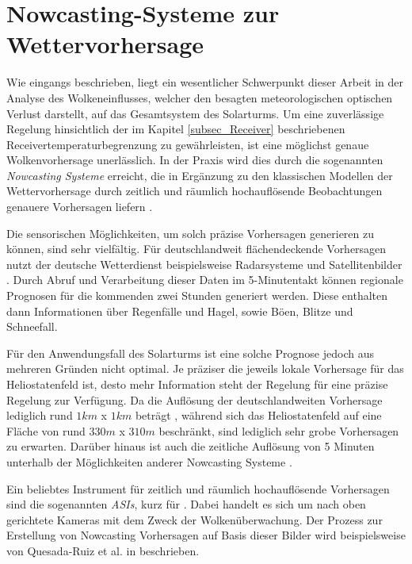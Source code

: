\section{Nowcasting-Systeme zur Wettervorhersage} \label{sec_Nowcasting}
Wie eingangs beschrieben, liegt ein wesentlicher Schwerpunkt dieser Arbeit in der Analyse des Wolkeneinflusses, welcher den besagten meteorologischen optischen Verlust darstellt, auf das Gesamtsystem des Solarturms.
Um eine zuverlässige Regelung hinsichtlich der im Kapitel \ref{subsec_Receiver} beschriebenen Receivertemperaturbegrenzung zu gewährleisten, ist eine möglichst genaue Wolkenvorhersage unerlässlich.
In der Praxis wird dies durch die sogenannten \textit{Nowcasting Systeme} erreicht, die in Ergänzung zu den klassischen Modellen der Wettervorhersage durch zeitlich und räumlich hochauflösende Beobachtungen genauere Vorhersagen liefern \cite{DWD1}.

Die sensorischen Möglichkeiten, um solch präzise Vorhersagen generieren zu können, sind sehr vielfältig.
Für deutschlandweit flächendeckende Vorhersagen nutzt der deutsche Wetterdienst beispielsweise Radarsysteme und Satellitenbilder \cite{DWD1}.
Durch Abruf und Verarbeitung dieser Daten im 5-Minutentakt können regionale Prognosen für die kommenden zwei Stunden generiert werden.
Diese enthalten dann Informationen über Regenfälle und Hagel, sowie Böen, Blitze und Schneefall.

Für den Anwendungsfall des Solarturms ist eine solche Prognose jedoch aus mehreren Gründen nicht optimal.
Je präziser die jeweils lokale Vorhersage für das Heliostatenfeld ist, desto mehr Information steht der Regelung für eine präzise Regelung zur Verfügung.
Da die Auflösung der deutschlandweiten Vorhersage lediglich rund $1km$ x $1km$ beträgt \cite{DWD1}\cite{DWD2}, während sich das Heliostatenfeld auf eine Fläche von rund $330m$ x $310m$ beschränkt, sind lediglich sehr grobe Vorhersagen zu erwarten.
Darüber hinaus ist auch die zeitliche Auflösung von 5 Minuten \cite{DWD2} unterhalb der Möglichkeiten anderer Nowcasting Systeme \cite{DLRNowcasting}\cite[S.272]{QuesadaRuiz}.

Ein beliebtes Instrument für zeitlich und räumlich hochauflösende Vorhersagen sind die sogenannten \textit{ASIs}, kurz für .
Dabei handelt es sich um nach oben gerichtete Kameras mit dem Zweck der Wolkenüberwachung.
Der Prozess zur Erstellung von Nowcasting Vorhersagen auf Basis dieser Bilder wird beispielsweise von Quesada-Ruiz et al. in \cite{QuesadaRuiz} beschrieben. \cite{Samu}

